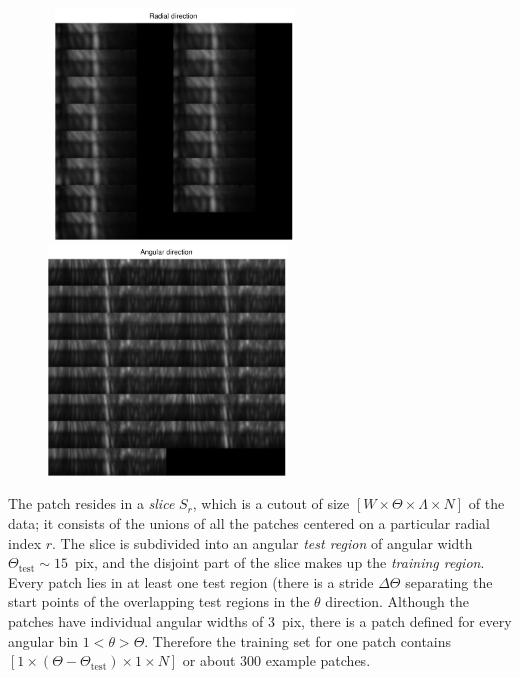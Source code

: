\documentclass[12pt,pdftex,preprint]{aastex}
\newcommand{\test}{\mathrm{test}}
\begin{document}
\begin{figure}[h!]
\begin{center}
\mbox{
\includegraphics[width=2.5in]{figs/radius.pdf}
\includegraphics[width=2.5in]{figs/theta.pdf}
}
\end{center}
\vspace{-7mm}
\caption{}
\label{fig:radiustheta}
\end{figure}
 

The patch resides in a \emph{slice} $S_r$, which is a cutout of size
$[W\times\Theta\times\Lambda\times N]$ of the data; it consists of the
unions of all the patches centered on a particular radial index $r$.
The slice is subdivided into an angular \emph{test region} of angular
width $\Theta_\test\sim 15$~pix, and the disjoint part of the slice
makes up the \emph{training region}.  Every patch lies in at least one
test region (there is a stride $\Delta\Theta$ separating the start
points of the overlapping test regions in the $\theta$ direction.
Although the patches have individual angular widths of 3~pix, there is
a patch defined for every angular bin $1 < \theta > \Theta$.
Therefore the training set for one patch contains
$[1\times(\Theta-\Theta_\test)\times 1\times N]$ or about 300 example
patches.
\end{document}
